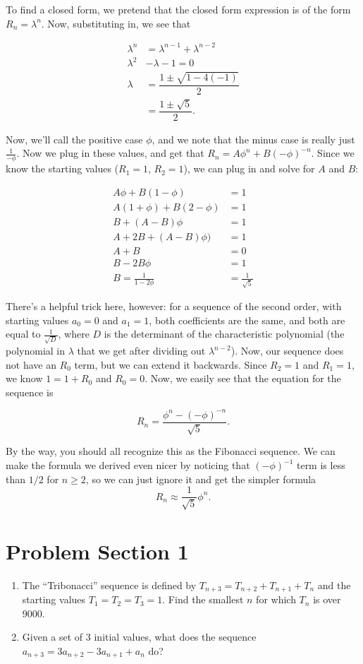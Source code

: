 \documentclass[12pt,letterpaper]{article}
\begin{document}
To find a closed form, we pretend that the closed form expression is of the
form $R_n = \lambda^n$. Now, substituting in, we see that

\begin{align*}
\lambda^n & = \lambda^{n-1} + \lambda^{n-2} \\
\lambda^2 & - \lambda - 1 = 0 \\
\lambda & = \dfrac{1 \pm \sqrt{1 - 4 (-1)}}{2} \\
        & = \dfrac{1 \pm \sqrt{5}}{2}.
\end{align*}

Now, we'll call the positive case $\phi$, and we note that the minus
case is really just $\frac1{-\phi}$. Now we plug in these values, and get
that $R_n = A \phi^n + B (-\phi)^{-n}$. Since we know the starting
values ($R_1 = 1$, $R_2 = 1$), we can plug in and solve for $A$ and
$B$:

\begin{align*}
  A \phi + B (1 - \phi) & = 1 \\
  A (1 + \phi) + B (2 - \phi) & = 1 \\
  B + (A - B) \phi & = 1 \\
  A + 2B + (A - B)\phi) & = 1 \\
  A + B & = 0 \\
  B - 2B \phi & = 1 \\
  B = \frac{1}{1-2\phi} & = \frac1{\sqrt{5}}
\end{align*}

There's a helpful trick here, however: for a sequence of the second
order, with starting values $a_0 = 0$ and $a_1 = 1$, both coefficients
are the same, and both are equal to $\frac1{\sqrt{D}}$, where $D$ is the
determinant of the characteristic polynomial (the polynomial
in $\lambda$ that we get after dividing out $\lambda^{n-2}$). Now, our
sequence does not have an $R_0$ term, but we can extend it
backwards. Since $R_2 = 1$ and $R_1 = 1$, we know $1 = 1 + R_0$ and $R_0 = 0$.
Now, we easily see that the equation for the sequence is

$$R_n = \frac{\phi^n - (-\phi)^{-n}}{\sqrt{5}}.$$

By the way, you should all recognize this as the Fibonacci sequence. We
can make the formula we derived even nicer by noticing that
$(-\phi)^{-1}$ term is less than $1/2$ for $n \ge 2$, so we can just ignore
it and get the simpler formula $$R_n \approx
\frac1{\sqrt{5}} \phi^n.$$

\section{Problem Section 1}
\begin{enumerate}
  \item The ``Tribonacci'' sequence is defined by $T_{n+3} = T_{n+2} + T_{n+1}
  + T_n$ and the starting values $T_1 = T_2 = T_3 = 1$. Find the smallest $n$ for which $T_n$ is over
  9000.
  \item Given a set of 3 initial values, what does the sequence $a_{n+3} =
  3a_{n+2} - 3a_{n+1} + a_n$ do?
\end{enumerate}
\end{document}
